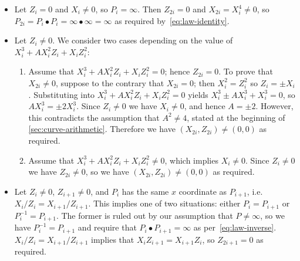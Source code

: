 \documentclass[manuscript]{acmart}
\begin{document}
\begin{itemize}
    \item Let $Z_i=0$ and $X_i \ne 0$, so $P_i = \infty$.
        Then $Z_{2i}=0$ and $X_{2i} = X_i^4 \ne 0$, so $P_{2i} = P_i \bullet P_i = \infty\bullet\infty = \infty$ as required by~\eqref{eq:law-identity}.
    \item Let $Z_i \ne 0$. We consider two cases depending on the value of $X_i^3 + AX_i^2 Z_i + X_i Z_i^2$:
        \begin{enumerate}
            \item Assume that $X_i^3 + AX_i^2 Z_i + X_i Z_i^2 = 0$; hence $Z_{2i} = 0$.
                To prove that $X_{2i} \ne 0$, suppose to the contrary that $X_{2i}=0$; then $X_i^2 = Z_i^2$ so $Z_i = \pm X_i$.
                Substituting into $X_i^3 + AX_i^2 Z_i + X_i Z_i^2 = 0$ yields $X_i^3 \pm AX_i^3 + X_i^3 = 0$, so $AX_i^3 = \pm 2X_i^3$.
                Since $Z_i \ne 0$ we have $X_i \ne 0$, and hence $A = \pm 2$.
                However, this contradicts the assumption that $A^2 \ne 4$, stated at the beginning of \autoref{sec:curve-arithmetic}.
                Therefore we have $(X_{2i}, Z_{2i}) \ne (0, 0)$ as required.
            \item Assume that $X_i^3 + AX_i^2 Z_i + X_i Z_i^2 \ne 0$, which implies $X_i \ne 0$.
                Since $Z_i \ne 0$ we have $Z_{2i} \ne 0$, so we have $(X_{2i}, Z_{2i}) \ne (0, 0)$ as required.
        \end{enumerate}
    \item Let $Z_i \ne 0$, $Z_{i+1} \ne 0$, and $P_i$ has the same $x$ coordinate as $P_{i+1}$, i.e.\ $X_i/Z_i = X_{i+1}/Z_{i+1}$.
        This implies one of two situations: either $P_i = P_{i+1}$ or $P_i^{-1} = P_{i+1}$.
        The former is ruled out by our assumption that $P \ne \infty$, so we have $P_i^{-1} = P_{i+1}$ and require that $P_i \bullet P_{i+1} = \infty$ as per~\eqref{eq:law-inverse}.
        $X_i/Z_i = X_{i+1}/Z_{i+1}$ implies that $X_i Z_{i+1} = X_{i+1} Z_{i}$, so $Z_{2i+1} = 0$ as required.


\end{itemize}
\end{document}
